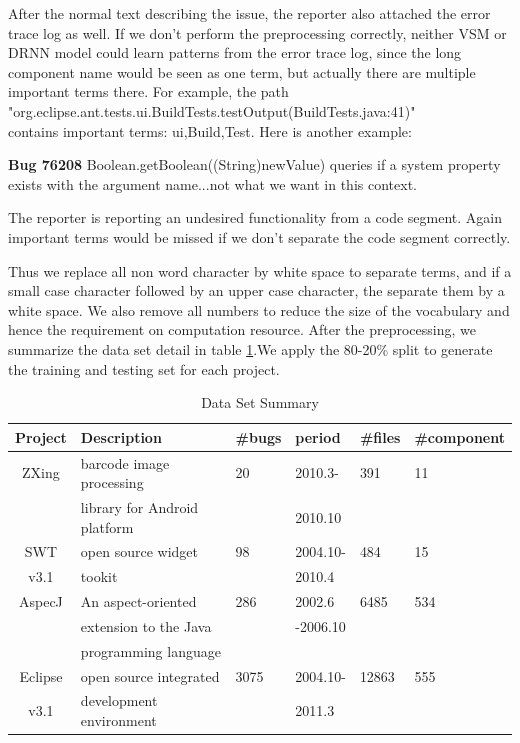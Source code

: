 After the normal text describing the issue, the reporter also attached the error trace log as well.
If we don't perform the preprocessing correctly, neither VSM or DRNN model could learn patterns from the error trace log, since the long component name would be seen as one term, but actually there are multiple important terms there. 
For example, the path\\ "org.eclipse.ant.tests.ui.BuildTests.testOutput(BuildTests.java:41)"\\ contains important terms: ui,Build,Test. Here is another example:

\textbf{Bug 76208}
Boolean.getBoolean((String)newValue) queries if a system property exists with the argument name...not what we want in this context.


The reporter is reporting an undesired functionality from a code segment. Again important terms would be missed if we don't separate the code segment correctly. 

Thus we replace all non word character by white space to separate terms, and if a small case character followed by an upper case character, the separate them by a white space. 
We also remove all numbers to reduce the size of the vocabulary and hence the requirement on computation resource. 
After the preprocessing, we summarize the data set detail in table \ref{data_table}.We apply the 80-20\% split to generate the training and testing set for each project.

\begin{table}[!tbh]
	\begin{center}
		\caption{Data Set Summary}
		\label{data_table}
		
		\begin{tabular}{c|l|l|l|l|l} %
			\textbf{Project} & \textbf{Description} & \textbf{\#bugs} & \textbf{period} & \textbf{\#files} & \textbf{\#component}\\
			\hline\hline
			ZXing & barcode image processing  & 20 & 2010.3-& 391 &11\\
                  &library  for Android platform & &  2010.10 & & \\			
			SWT & open source widget & 98 & 2004.10-& 484 &15\\
			v3.1 &  tookit & &2010.4 & &\\
			AspecJ & An aspect-oriented  & 286 &2002.6 & 6485 & 534\\
			       &   extension to the Java & & -2006.10 & &\\
			       &    programming language & & & &\\
			Eclipse & open source integrated& 3075&2004.10- & 12863& 555\\
 			 v3.1 &  development environment& &2011.3 &  &\\
		\end{tabular}
	\end{center}
\end{table}

